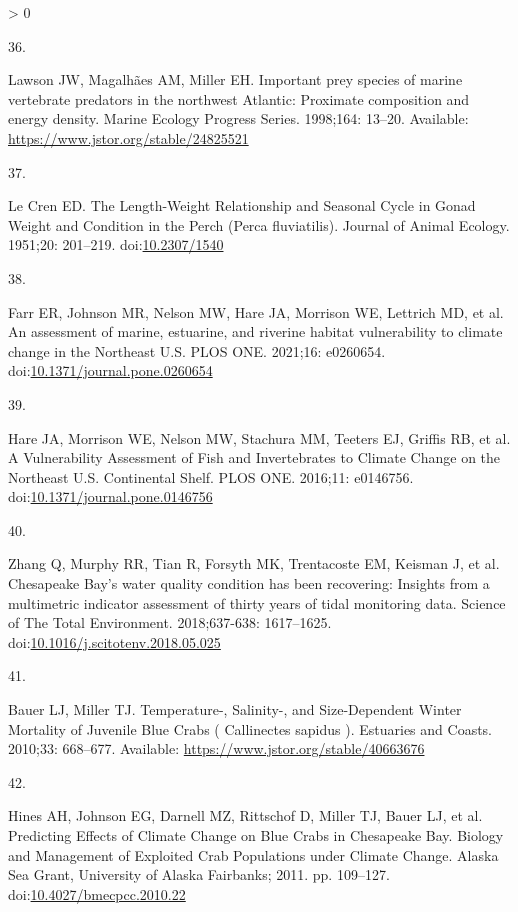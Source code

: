 \documentclass[
  10pt,
]{article}
\newlength{\cslhangindent}
\newlength{\csllabelwidth}
\newenvironment{CSLReferences}[2] %
 {%
  \setlength{\parindent}{0pt}
  \ifodd #1 \everypar{\setlength{\hangindent}{\cslhangindent}}\ignorespaces\fi
  \ifnum #2 > 0
  \setlength{\parskip}{#2\baselineskip}
  \fi
 }%
 {}
\newcommand{\CSLLeftMargin}[1]{\parbox[t]{\csllabelwidth}{#1}}
\newcommand{\CSLRightInline}[1]{\parbox[t]{\linewidth - \csllabelwidth}{#1}\break}
\begin{document}
\begin{CSLReferences}{0}{0}
\leavevmode\hypertarget{ref-lawson_important_1998}{}%
\CSLLeftMargin{36. }
\CSLRightInline{Lawson JW, Magalhães AM, Miller EH. Important prey
species of marine vertebrate predators in the northwest {Atlantic}:
Proximate composition and energy density. Marine Ecology Progress
Series. 1998;164: 13--20. Available:
\url{https://www.jstor.org/stable/24825521}}

\leavevmode\hypertarget{ref-le_cren_length-weight_1951}{}%
\CSLLeftMargin{37. }
\CSLRightInline{Le Cren ED. The {Length}-{Weight} {Relationship} and
{Seasonal} {Cycle} in {Gonad} {Weight} and {Condition} in the {Perch}
({Perca} fluviatilis). Journal of Animal Ecology. 1951;20: 201--219.
doi:\href{https://doi.org/10.2307/1540}{10.2307/1540}}

\leavevmode\hypertarget{ref-farr_assessment_2021}{}%
\CSLLeftMargin{38. }
\CSLRightInline{Farr ER, Johnson MR, Nelson MW, Hare JA, Morrison WE,
Lettrich MD, et al. An assessment of marine, estuarine, and riverine
habitat vulnerability to climate change in the {Northeast} {U}.{S}. PLOS
ONE. 2021;16: e0260654.
doi:\href{https://doi.org/10.1371/journal.pone.0260654}{10.1371/journal.pone.0260654}}

\leavevmode\hypertarget{ref-hare_vulnerability_2016}{}%
\CSLLeftMargin{39. }
\CSLRightInline{Hare JA, Morrison WE, Nelson MW, Stachura MM, Teeters
EJ, Griffis RB, et al. A {Vulnerability} {Assessment} of {Fish} and
{Invertebrates} to {Climate} {Change} on the {Northeast} {U}.{S}.
{Continental} {Shelf}. PLOS ONE. 2016;11: e0146756.
doi:\href{https://doi.org/10.1371/journal.pone.0146756}{10.1371/journal.pone.0146756}}

\leavevmode\hypertarget{ref-zhang_chesapeake_2018}{}%
\CSLLeftMargin{40. }
\CSLRightInline{Zhang Q, Murphy RR, Tian R, Forsyth MK, Trentacoste EM,
Keisman J, et al. Chesapeake {Bay}'s water quality condition has been
recovering: {Insights} from a multimetric indicator assessment of thirty
years of tidal monitoring data. Science of The Total Environment.
2018;637-638: 1617--1625.
doi:\href{https://doi.org/10.1016/j.scitotenv.2018.05.025}{10.1016/j.scitotenv.2018.05.025}}

\leavevmode\hypertarget{ref-bauer_temperature-_2010}{}%
\CSLLeftMargin{41. }
\CSLRightInline{Bauer LJ, Miller TJ. Temperature-, {Salinity}-, and
{Size}-{Dependent} {Winter} {Mortality} of {Juvenile} {Blue} {Crabs} (
{Callinectes} sapidus ). Estuaries and Coasts. 2010;33: 668--677.
Available: \url{https://www.jstor.org/stable/40663676}}

\leavevmode\hypertarget{ref-hines_predicting_2011}{}%
\CSLLeftMargin{42. }
\CSLRightInline{Hines AH, Johnson EG, Darnell MZ, Rittschof D, Miller
TJ, Bauer LJ, et al. Predicting {Effects} of {Climate} {Change} on
{Blue} {Crabs} in {Chesapeake} {Bay}. Biology and {Management} of
{Exploited} {Crab} {Populations} under {Climate} {Change}. Alaska Sea
Grant, University of Alaska Fairbanks; 2011. pp. 109--127.
doi:\href{https://doi.org/10.4027/bmecpcc.2010.22}{10.4027/bmecpcc.2010.22}}


\end{CSLReferences}
\end{document}
